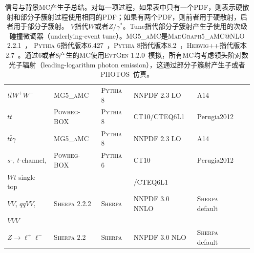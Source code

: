 \begin{table}[h]
\begin{center}
{{\begin{tabular}{llllll}
$t\bar t W^+ W^-$ & \textsc{MG5\_aMC} & \textsc{Pythia} 8 & NNPDF 2.3 LO & A14  \\
$t\bar{t}$ & \textsc{Powheg-BOX} \cite{powhegtt} & \textsc{Pythia} 8 & CT10/CTEQ6L1 & Perugia2012  \\
$t\bar{t}\gamma$ & \textsc{MG5\_aMC} & \textsc{Pythia} 8 & NNPDF 2.3 LO & A14  \\
$s$-, $t$-channel, & \textsc{Powheg-BOX} \cite{powhegstp,powhegstp2} & \textsc{Pythia} 6 & CT10 & Perugia2012   \\
 $Wt$ single top & & & /CTEQ6L1 \\
$VV$, $qqVV$, & \textsc{Sherpa} 2.2.2 \cite{sherpa} & \textsc{Sherpa} & NNPDF 3.0 NNLO & \textsc{Sherpa} default  \\
$VVV$ & & & \\
$Z \to \ell^+\ell^-$ & \textsc{Sherpa} 2.2 & \textsc{Sherpa} & NNPDF 3.0 NLO & \textsc{Sherpa} default \\
\hline\hline
\end{tabular}}
}
\caption{\label{tab:mcconfig} 
信号与背景MC产生子总结。对每一项过程，如果表中只有一个PDF，则表示硬散射和部分子簇射过程使用相同的PDF；如果有两个PDF，则前者用于硬散射，后者用于部分子簇射。
$V$指代$W$或者$Z/\gamma^*$。Tune指代部分子簇射产生子使用的次级碰撞微调器（underlying-event tune）。\textsc{MG5\_aMC}是\textsc{MadGraph5\_aMC@NLO} 2.2.1~\cite{Alwall:2014hca}，
\textsc{Pythia} 6指代版本6.427~\cite{pythia6}，\textsc{Pythia} 8指代版本8.2~\cite{pythia8}，\textsc{Herwig++}指代版本2.7~\cite{Bahr:2008pv}。通过\PYTHIA 6或者\PYTHIA 8产生的MC使用\textsc{EvtGen} 1.2.0~\cite{Lange:2001uf}模拟，所有MC均考虑领头阶对数光子辐射（leading-logarithm photon emission），这通过部分子簇射产生子或者\textsc{PHOTOS}~\cite{Golonka:2005pn}仿真。
}
\end{center}
\end{table}

